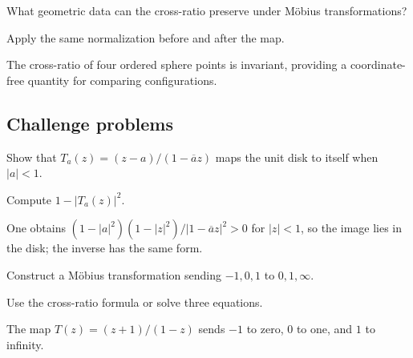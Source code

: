 \begin{exercise}\label{exr:iv16-expand-14}
What geometric data can the cross-ratio preserve under Möbius transformations?
\end{exercise}
\begin{hint}
Apply the same normalization before and after the map.
\end{hint}
\begin{solution}
The cross-ratio of four ordered sphere points is invariant, providing a coordinate-free quantity for comparing configurations.
\end{solution}

\subsection*{Challenge problems}

\begin{exercise}\label{exr:iv16-expand-15}
Show that \(T_a(z)=(z-a)/(1-\overline a z)\) maps the unit disk to itself when \(|a|<1\).
\end{exercise}
\begin{hint}
Compute \(1-|T_a(z)|^2\).
\end{hint}
\begin{solution}
One obtains \((1-|a|^2)(1-|z|^2)/|1-\overline a z|^2>0\) for \(|z|<1\), so the image lies in the disk; the inverse has the same form.
\end{solution}

\begin{exercise}\label{exr:iv16-expand-16}
Construct a Möbius transformation sending \(-1,0,1\) to \(0,1,\infty\).
\end{exercise}
\begin{hint}
Use the cross-ratio formula or solve three equations.
\end{hint}
\begin{solution}
The map \(T(z)=(z+1)/(1-z)\) sends \(-1\) to zero, \(0\) to one, and \(1\) to infinity.
\end{solution}

